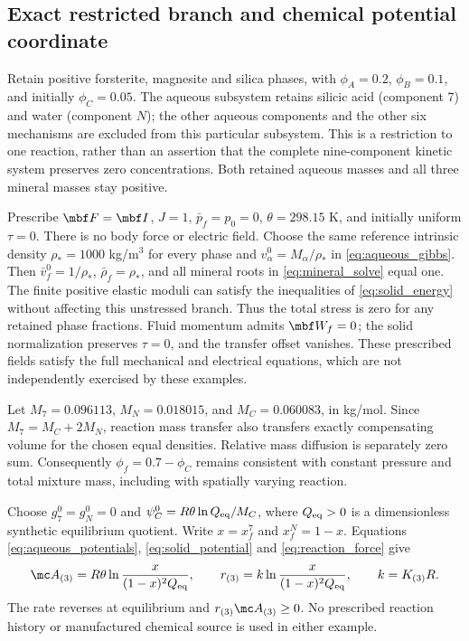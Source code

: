 \documentclass[11pt]{article}
\begin{document}
\subsection{Exact restricted branch and chemical potential coordinate}
Retain positive forsterite, magnesite and silica phases, with \(\phi_A=0.2\), \(\phi_B=0.1\), and initially \(\phi_C=0.05\). The aqueous subsystem retains silicic acid (component 7) and water (component \(N\)); the other aqueous components and the other six mechanisms are excluded from this particular subsystem. This is a restriction to one reaction, rather than an assertion that the complete nine-component kinetic system preserves zero concentrations. Both retained aqueous masses and all three mineral masses stay positive.

Prescribe \(\mbf F=\mbf I\), \(J=1\), \(\bar p_f=p_0=0\), \(\theta=298.15\) K, and initially uniform \(\tau=0\). There is no body force or electric field. Choose the same reference intrinsic density \(\rho_*=1000\) kg/m\(^3\) for every phase and \(v_\alpha^0=M_\alpha/\rho_*\) in \eqref{eq:aqueous_gibbs}. Then \(\bar v_f^0=1/\rho_*\), \(\bar\rho_f=\rho_*\), and all mineral roots in \eqref{eq:mineral_solve} equal one. The finite positive elastic moduli can satisfy the inequalities of \eqref{eq:solid_energy} without affecting this unstressed branch. Thus the total stress is zero for any retained phase fractions. Fluid momentum admits \(\mbf W_f=0\); the solid normalization preserves \(\tau=0\), and the transfer offset vanishes. These prescribed fields satisfy the full mechanical and electrical equations, which are not independently exercised by these examples.

Let \(M_7=0.096113\), \(M_N=0.018015\), and \(M_C=0.060083\), in kg/mol. Since \(M_7=M_C+2M_N\), reaction mass transfer also transfers exactly compensating volume for the chosen equal densities. Relative mass diffusion is separately zero sum. Consequently \(\phi_f=0.7-\phi_C\) remains consistent with constant pressure and total mixture mass, including with spatially varying reaction.

Choose \(g_7^0=g_N^0=0\) and \(\psi_C^0=R\theta\ln Q_{\rm eq}/M_C\), where \(Q_{\rm eq}>0\) is a dimensionless synthetic equilibrium quotient. Write \(x=x_f^7\) and \(x_f^N=1-x\). Equations \eqref{eq:aqueous_potentials}, \eqref{eq:solid_potential} and \eqref{eq:reaction_force} give
\begin{equation}
 \mc A_{(3)}=R\theta\ln\frac{x}{(1-x)^2Q_{\rm eq}},
 \qquad r_{(3)}=k\ln\frac{x}{(1-x)^2Q_{\rm eq}},
 \qquad k=K_{(3)}R.
 \label{eq:silica_rate}
\end{equation}
The rate reverses at equilibrium and \(r_{(3)}\mc A_{(3)}\ge0\). No prescribed reaction history or manufactured chemical source is used in either example.
\end{document}
